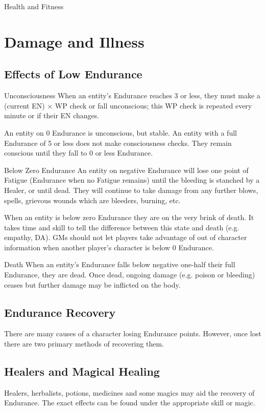 \begin{Chapter}{Health and Fitness}
\section{Damage and Illness}
\label{health:damage}\label{health:illness}
\subsection{Effects of Low Endurance}

Unconsciousness When an entity’s Endurance reaches 3 or less, they
must make a (current EN) × WP check or fall unconscious; this WP check
is repeated every minute or if their EN changes.

An entity on 0 Endurance is unconscious, but stable.  An entity with a
full Endurance of 5 or less does not make consciousness checks. They
remain conscious until they fall to 0 or less Endurance.

Below Zero Endurance An entity on negative Endurance will lose one
point of Fatigue (Endurance when no Fatigue remains) until the
bleeding is stanched by a Healer, or until dead.  They will continue
to take damage from any further blows, spells, grievous wounds which
are bleeders, burning, etc.

When an entity is below zero Endurance they are on the very brink of
death. It takes time and skill to tell the difference between this
state and death (e.g.  empathy, DA).  GMs should not let players take
advantage of out of character information when another player’s
character is below 0 Endurance.

Death When an entity’s Endurance falls below negative one-half their
full Endurance, they are dead.  Once dead, ongoing damage (e.g.
poison or bleeding) ceases but further damage may be inflicted on the
body.

\subsection{Endurance Recovery}

There are many causes of a character losing Endurance points.
However, once lost there are two primary methods of recovering them.

\subsection{Healers and Magical Healing}

Healers, herbalists, potions, medicines and some magics may aid the
recovery of Endurance.  The exact effects can be found under the
appropriate skill or magic.


\end{Chapter}
